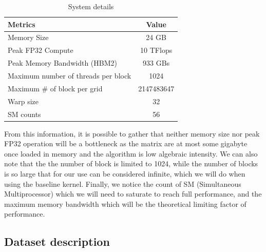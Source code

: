\documentclass[conference]{IEEEtran}
\begin{document}
\begin{table}[h!]
	\centering
	\begin{adjustbox}{width=0.8\columnwidth}
		\begin{tabular}{lc}
			\toprule
			\textbf{Metrics} &  \textbf{Value}  \\
			\midrule
			Memory Size & 24 GB \\
			Peak FP32 Compute &  10 TFlops   \\
			Peak Memory Bandwidth (HBM2) & 933 GBs  \\
			Maximum number of threads per block & 1024 \\
			Maximum \# of block per grid & 2147483647 \\
			Warp size & 32 \\
			SM counts & 56\\
			\bottomrule
		\end{tabular}
	\end{adjustbox}
	\vspace{1em}

	\caption{System details}
	\label{tab:system_description}
\end{table}

From this information, it is possible to gather that neither memory size nor peak FP32 operation will be a bottleneck as the matrix are at most some gigabyte once loaded in memory and the algorithm is low algebraic intensity. We can also note that the the number of block is limited to 1024, while the number of blocks is so large that for our use can be considered infinite, which we will do when using the baseline kernel. Finally, we notice the count of SM (Simultaneous Multiprocessor) which we will need to saturate to reach full performance, and the maximum memory bandwidth which will be the theoretical limiting factor of performance.



\subsection{Dataset description}
\end{document}
